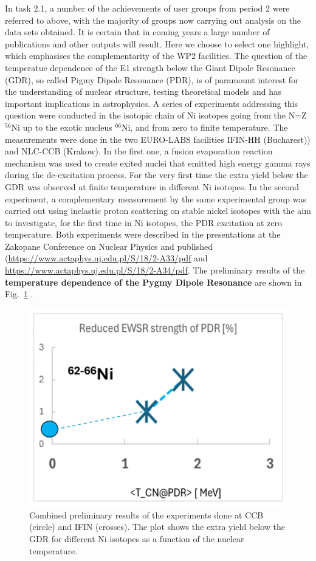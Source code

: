 In task 2.1, a number of the achievements of user groups from period 2 were referred to above, with the majority of groups now carrying out analysis on the data sets obtained. It is certain that in coming years a large number of publications and other outputs will result. Here we choose to select one highlight, which emphasises the complementarity of the WP2 facilities. 
The question of the temperatue dependence of the E1 strength below the Giant Dipole Resonance (GDR), so called Pigmy Dipole Resonance (PDR), is of paramount interest for the understanding of nuclear structure, testing theoretical models and has important implications in astrophysics. A series of experiments addressing this question were conducted in the isotopic chain of Ni isotopes going from the N=Z $^{56}$Ni up to the exotic nucleus $^{66}$Ni, and from zero to finite temperature. The measurements were done in the two EURO-LABS facilities IFIN-HH (Bucharest)) and NLC-CCB (Krakow). In the first one, a fusion evaporation reaction mechanism was used to create exited nuclei that emitted high energy gamma rays during the de-excitation process.
For the very first time the extra yield below the GDR was observed at finite temperature in different Ni isotopes. In the second experiment, a complementary measurement by the same experimental group was carried out using inelastic proton scattering on stable nickel isotopes with the aim to investigate, for the first time in Ni isotopes, the PDR excitation 
at zero temperature. 
Both experiments were described in the presentations at the Zakopane Conference on Nuclear Physics and published ({\url{https://www.actaphys.uj.edu.pl/S/18/2-A33/pdf} and \url{https://www.actaphys.uj.edu.pl/S/18/2-A34/pdf}. The preliminary results of the \textbf{temperature dependence of the Pygmy Dipole Resonance} are shown in Fig.~\ref{fig:Wieland} }.

\begin{figure}[!h]
    \centering
    \includegraphics[width=0.6\linewidth]{graphics/Wieland.png}
    \caption{Combined preliminary results of the experiments done at CCB (circle) and IFIN (crosses). The plot shows the extra yield below the GDR for different Ni isotopes as a function of the nuclear temperature.
}
    \label{fig:Wieland}
\end{figure}


